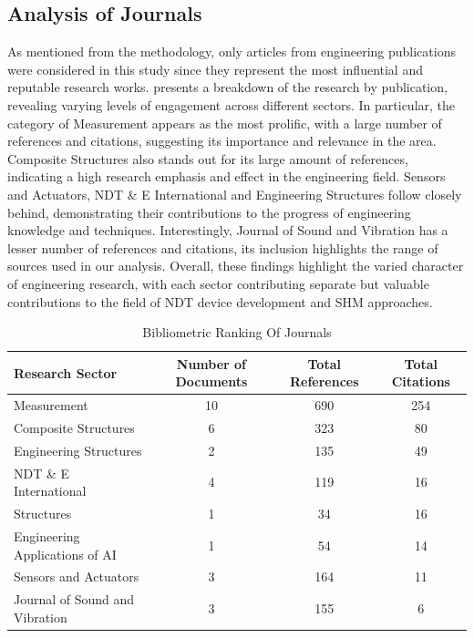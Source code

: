\documentclass[journal, a4paper]{IEEEtran}
\begin{document}
\subsection{Analysis of Journals}
As mentioned from the methodology, only articles from engineering publications were considered in this study since they
represent the most influential and reputable research works.
\label{tbl:bibliometricRanking} presents a breakdown of the research by publication,
revealing varying levels of engagement across different sectors.
In particular, the category of Measurement appears as the most prolific,
with a large number of references and citations, suggesting its importance and relevance in the area.
Composite Structures also stands out for its large amount of references,
indicating a high research emphasis and effect in the engineering field.
Sensors and Actuators, NDT \& E International and Engineering Structures follow closely behind,
demonstrating their contributions to the progress of engineering knowledge and techniques.
Interestingly, Journal of Sound and Vibration has a lesser number of references and citations,
its inclusion highlights the range of sources used in our analysis.
Overall, these findings highlight the varied character of engineering research, with each sector contributing separate
but valuable contributions to the field of NDT device development and SHM approaches.

\begin{table}[h]

  \centering
  \caption{Bibliometric Ranking Of Journals}
  \label{tbl:bibliometricRanking}
  \begin{tabular}{lccc}

      \toprule
      \textbf{Research Sector} & \textbf{Number of Documents} & \textbf{Total References} & \textbf{Total Citations}  \\
      \midrule
      Measurement & 10 & 690 & 254 \\
      Composite Structures & 6 & 323 & 80 \\
      Engineering Structures & 2 & 135 & 49 \\
      NDT \& E International & 4 & 119 & 16 \\
      Structures & 1 & 34 & 16 \\
      Engineering Applications of AI & 1 & 54 & 14 \\
      Sensors and Actuators & 3 & 164 & 11 \\
      Journal of Sound and Vibration & 3 & 155 & 6 \\

      \bottomrule
  \end{tabular}
\end{table}
\end{document}
